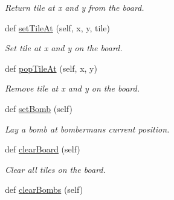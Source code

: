 \begin{DoxyCompactItemize}
\begin{DoxyCompactList}\small\item\em Return tile at x and y from the board. \end{DoxyCompactList}\item 
\hypertarget{classsrc_1_1level_1_1_level_a1b0a565e03f055cd93abe6faeefd3b4f}{}def \hyperlink{classsrc_1_1level_1_1_level_a1b0a565e03f055cd93abe6faeefd3b4f}{set\+Tile\+At} (self, x, y, tile)\label{classsrc_1_1level_1_1_level_a1b0a565e03f055cd93abe6faeefd3b4f}

\begin{DoxyCompactList}\small\item\em Set tile at x and y on the board. \end{DoxyCompactList}\item 
\hypertarget{classsrc_1_1level_1_1_level_a79a922117841f374126a4ab727a65ef1}{}def \hyperlink{classsrc_1_1level_1_1_level_a79a922117841f374126a4ab727a65ef1}{pop\+Tile\+At} (self, x, y)\label{classsrc_1_1level_1_1_level_a79a922117841f374126a4ab727a65ef1}

\begin{DoxyCompactList}\small\item\em Remove tile at x and y on the board. \end{DoxyCompactList}\item 
\hypertarget{classsrc_1_1level_1_1_level_aa1fdbf2a27cb66fffd27bc2598449072}{}def \hyperlink{classsrc_1_1level_1_1_level_aa1fdbf2a27cb66fffd27bc2598449072}{set\+Bomb} (self)\label{classsrc_1_1level_1_1_level_aa1fdbf2a27cb66fffd27bc2598449072}

\begin{DoxyCompactList}\small\item\em Lay a bomb at bomberman\textquotesingle{}s current position. \end{DoxyCompactList}\item 
\hypertarget{classsrc_1_1level_1_1_level_ab1083324efb6eddfdfc04316a85f7f15}{}def \hyperlink{classsrc_1_1level_1_1_level_ab1083324efb6eddfdfc04316a85f7f15}{clear\+Board} (self)\label{classsrc_1_1level_1_1_level_ab1083324efb6eddfdfc04316a85f7f15}

\begin{DoxyCompactList}\small\item\em Clear all tiles on the board. \end{DoxyCompactList}\item 
\hypertarget{classsrc_1_1level_1_1_level_a5cacfb3b893af155c71dfffc3ae042bd}{}def \hyperlink{classsrc_1_1level_1_1_level_a5cacfb3b893af155c71dfffc3ae042bd}{clear\+Bombs} (self)\label{classsrc_1_1level_1_1_level_a5cacfb3b893af155c71dfffc3ae042bd}


\end{DoxyCompactItemize}
